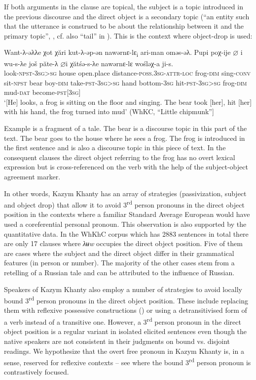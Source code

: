 \documentclass[output=paper]{langscibook}
\begin{document}
If both arguments in the clause are topical, the subject is a topic introduced in the previous discourse and the direct object is a secondary topic (“an entity such that the utterance is construed to be about the relationship between it and the primary topic”, \citealt{Nikolaeva1999Ostyak, Nikolaeva1999Agreement}, cf. also “tail” in \citealt{Vallduvi1992}). This is the context where object-drop is used: 

\ea 
\label{ex:Volkova:75}
 \gll Want-λ-əλλe χot χări kut-λ-əp-ən nawərnɛ-lɛ\textsubscript{i} ari-man oməs-əλ. Pupi poχ-ije ${\varnothing}$ i wu-s-λe još păte-λ ${\varnothing}$i χătśə-s-λe nawərnɛ-lɛ wośləχ-a ji-s.\\
 look\textsc{{}-npst-3sg>sg} house open.place distance\textsc{{}-poss.3sg-attr-loc} frog\textsc{{}-dim} sing\textsc{{}-conv} sit\textsc{{}-npst} bear boy\textsc{{}-dim} take\textsc{{}-pst-3sg>sg} hand bottom\textsc{{}-3sg} hit\textsc{{}-pst-3sg>sg} frog\textsc{{}-dim} mud\textsc{{}-dat} become\textsc{{}-pst[3sg]}\\
 \glt ‘[He] looks, a frog is sitting on the floor and singing. The bear took [her], hit [her] with his hand, the frog turned into mud’ (WhKC, “Little chipmunk”]
\z


Example  is a fragment of a tale. The bear is a discourse topic in this part of the text. The bear goes to the house where he sees a frog. The frog is introduced in the first sentence and is also a discourse topic in this piece of text. In the consequent clauses the direct object referring to the frog has no overt lexical expression but is cross-referenced on the verb with the help of the subject-object agreement marker. 

In other words, Kazym Khanty has an array of strategies (passivization, subject and object drop) that allow it to avoid 3\textsuperscript{rd} person pronouns in the direct object position in the contexts where a familiar Standard Average European would have used a coreferential personal pronoun. This observation is also supported by the quantitative data. In the WhKhC corpus which has 2883 sentences in total there are only 17 clauses where \textit{λʉw} occupies the direct object position. Five of them are cases where the subject and the direct object differ in their grammatical features (in person or number). The majority of the other cases stem from a retelling of a Russian tale and can be attributed to the influence of Russian. 

Speakers of Kazym Khanty also employ a number of strategies to avoid locally bound 3\textsuperscript{rd} person pronouns in the direct object position. These include replacing them with reflexive possessive constructions () or using a detransitivised form of a verb instead of a transitive one. However, a 3\textsuperscript{rd} person pronoun in the direct object position is a regular variant in isolated elicited sentences even though the native speakers are not consistent in their judgments on bound vs. disjoint readings. We hypothesize that the overt free pronoun in Kazym Khanty is, in a sense, reserved for reflexive contexts – see  where the bound 3\textsuperscript{rd} person pronoun is contrastively focused. 
\end{document}
